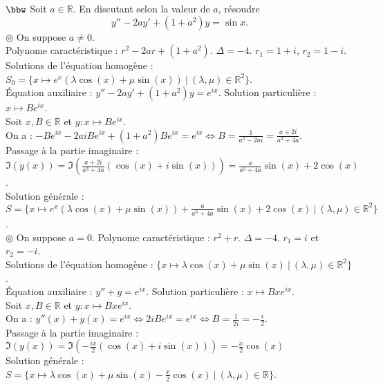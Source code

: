 \documentclass[11pt]{article}
\begin{document}
\begin{exercice}{$\bbw$}{}
    Soit $a\in\mathbb{R}$. En discutant selon la valeur de $a$, résoudre
    \begin{equation*}
        y'' - 2ay' + (1+a^2)y = \sin x.
    \end{equation*}
    \tcblower
    $\circledcirc$ On suppose $a\neq0$.\\
    Polynome caractéristique : $r^2 - 2ar + (1 + a^2)$. $\Delta = -4$. $r_1 = 1 + i$, $r_2 = 1 - i$.\\
    Solutions de l'équation homogène : $S_0 = \{x\mapsto e^{x}\left( \lambda \cos(x) + \mu \sin(x) \right) ~ | ~ (\lambda, \mu)\in\mathbb{R}^2\}$.\\
    Équation auxiliaire : $y'' - 2ay' + (1+a^2)y = e^{ix}$. Solution particulière : $x\mapsto Be^{ix}$.\\
    Soit $x,B \in \mathbb{R}$ et $y:x\mapsto Be^{ix}$.\\
    On a : $-Be^{ix} - 2aiBe^{ix} + (1 + a^2)Be^{ix} = e^{ix} \iff B = \frac{1}{a^2-2ai} = \frac{a+2i}{a^3+4a}$.\\
    Passage à la partie imaginaire : $\Im(y(x))=\Im\left( \frac{a+2i}{a^3+4a}(\cos(x)+i\sin(x)) \right)=\frac{a}{a^3+4a}\sin(x) + 2\cos(x)$.\\
    Solution générale : $S=\{x\mapsto e^x(\lambda\cos(x) + \mu\sin(x)) + \frac{a}{a^3+4a}\sin(x) + 2\cos(x) ~ | ~ (\lambda, \mu)\in\mathbb{R}^2\}$.\\[0.2cm]
    $\circledcirc$ On suppose $a=0$.
    Polynome caractéristique : $r^2 + r$. $\Delta = -4$. $r_1 = i$ et $r_2 = -i$.\\
    Solutions de l'équation homogène : $\{x\mapsto \lambda\cos(x) + \mu\sin(x) ~ | ~ (\lambda, \mu)\in\mathbb{R}^2\}$.\\
    Équation auxiliaire : $y'' + y = e^{ix}$. Solution particulière : $x\mapsto Bxe^{ix}$.\\
    Soit $x,B\in\mathbb{R}$ et $y:x\mapsto Bxe^{ix}$.\\
    On a : $y''(x) + y(x) = e^{ix} \iff 2iBe^{ix} = e^{ix} \iff B = \frac{1}{2i} = -\frac{i}{2}$.\\
    Passage à la partie imaginaire : $\Im(y(x)) = \Im(-\frac{ix}{2}(\cos(x)+i\sin(x)))=-\frac{x}{2}\cos(x)$\\
    Solution générale : $S=\{x\mapsto \lambda\cos(x) + \mu\sin(x) - \frac{x}{2}\cos(x) ~ | ~ (\lambda, \mu)\in\mathbb{R}\}$.
\end{exercice}
\end{document}
